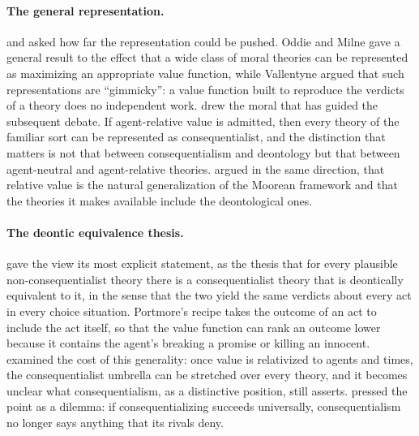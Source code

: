 \documentclass{situationist-preprint}
\begin{document}
\paragraph{The general representation.} \citet{Vallentyne1988} and \citet{OddieMilne1991} asked how far the representation could be pushed. Oddie and Milne gave a general result to the effect that a wide class of moral theories can be represented as maximizing an appropriate value function, while Vallentyne argued that such representations are ``gimmicky'': a value function built to reproduce the verdicts of a theory does no independent work. \citet{Dreier1993} drew the moral that has guided the subsequent debate. If agent-relative value is admitted, then every theory of the familiar sort can be represented as consequentialist, and the distinction that matters is not that between consequentialism and deontology but that between agent-neutral and agent-relative theories. \citet{Smith2003} argued in the same direction, that relative value is the natural generalization of the Moorean framework and that the theories it makes available include the deontological ones.

\paragraph{The deontic equivalence thesis.} \citet{Portmore2007,Portmore2009} gave the view its most explicit statement, as the thesis that for every plausible non-consequentialist theory there is a consequentialist theory that is deontically equivalent to it, in the sense that the two yield the same verdicts about every act in every choice situation. Portmore's recipe takes the outcome of an act to include the act itself, so that the value function can rank an outcome lower because it contains the agent's breaking a promise or killing an innocent. \citet{Louise2004} examined the cost of this generality: once value is relativized to agents and times, the consequentialist umbrella can be stretched over every theory, and it becomes unclear what consequentialism, as a distinctive position, still asserts. \citet{Sachs2010} pressed the point as a dilemma: if consequentializing succeeds universally, consequentialism no longer says anything that its rivals deny.
\end{document}
